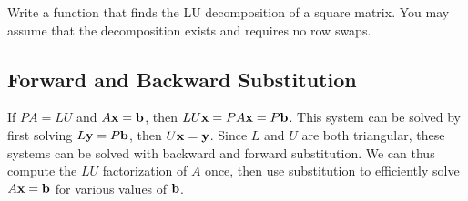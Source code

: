 \begin{problem}
Write a function that finds the LU decomposition of a square matrix.
You may assume that the decomposition exists and requires no row swaps.
\label{prob:LU-Decomposition}
\end{problem}

\subsection*{Forward and Backward Substitution} %

If $PA = LU$ and $A\mathbf{x} = \mathbf{b}$, then $LU\mathbf{x} = PA\mathbf{x} = P\mathbf{b}$.
This system can be solved by first solving $L\mathbf{y} = P\mathbf{b}$, then $U\mathbf{x} = \mathbf{y}$.
Since $L$ and $U$ are both triangular, these systems can be solved with backward and forward substitution.
We can thus compute the $LU$ factorization of $A$ once, then use substitution to efficiently solve $A\mathbf{x}=\mathbf{b}$ for various values of $\mathbf{b}$.


